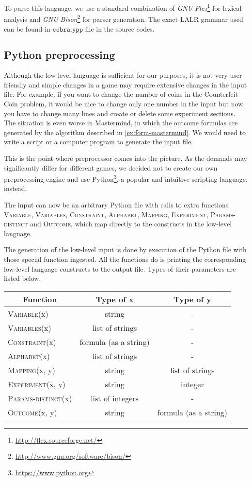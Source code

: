 To parse this language, we use a standard combination of
\emph{GNU Flex}\footnote{\url{http://flex.sourceforge.net/}} for lexical analysis and
\emph{GNU Bison}\footnote{\url{http://www.gnu.org/software/bison/}} for parser generation.
The exact LALR grammar used can be found in $\texttt{cobra.ypp}$ file
  in the source codes.

\subsection{Python preprocessing}

Although the low-level language is sufficient for our purposes,
  it is not very user-friendly and
  simple changes in a game may require extensive changes in the input file.
For example, if you want to change the number of coins in the Counterfeit Coin problem,
  it would be nice to change only one number in the input
  but now you have to change many lines and create or delete some experiment sections.
The situation is even worse in Mastermind, in which the outcome formulas are
  generated by the algorithm described in \ref{ex:form-mastermind}.
We would need to write a script or a computer program to generate the input file.

This is the point where preprocessor comes into the picture.
As the demands may significantly differ for different games,
  we decided not to create our own preprocessing engine
  and use Python\footnote{\url{https://www.python.org}},
  a popular and intuitive scripting language, instead.

The input can now be an arbitrary Python file with calls to extra functions
\textsc{Variable}, \textsc{Variables}, \textsc{Constraint}, \textsc{Alphabet},
\textsc{Mapping}, \textsc{Experiment}, \textsc{Params-distinct} and \textsc{Outcome},
which map directly to the constructs in the low-level language.

The generation of the low-level input is done by execution of the Python file
  with those special function ingested.
All the functions do is printing the corresponding low-level language constructs
  to the output file.
Types of their parameters are listed below.

\begin{center}
\begin{tabular}{lcc}
 \multicolumn{1}{c}{\textbf{Function}} & \textbf{Type of x} & \textbf{Type of y} \\\hline
\textsc{Variable}(x) & string & - \\
\textsc{Variables}(x) & list of strings & -\\
\textsc{Constraint}(x) & formula (as a string)& -\\
\textsc{Alphabet}(x) & list of strings & -\\
\textsc{Mapping}(x, y) & string & list of strings\\
\textsc{Experiment}(x, y) & string & integer \\
\textsc{Params-distinct}(x) & list of integers & -\\
\textsc{Outcome}(x, y) & string & formula (as a string)
\end{tabular}
\end{center}

